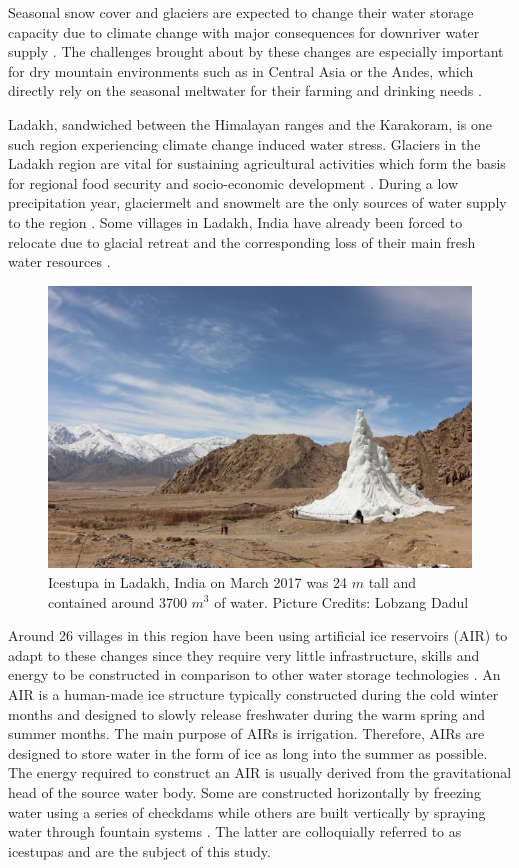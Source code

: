 \documentclass[utf8]{frontiersSCNS}
\begin{document}
Seasonal snow cover and glaciers are expected to change their water storage capacity due to climate
change with major consequences for downriver water supply \citep{Immerzeel_2020}. The challenges brought about
by these changes are especially important for dry mountain environments such as in Central Asia or the Andes,
which directly rely on the seasonal meltwater for their farming and drinking needs \citep{HoelzleBarandun_2019,
	Apel_2018, Buytaert_2017, Chen_2016, UNGERSHAYESTEH_2013}.

Ladakh, sandwiched between the Himalayan ranges and the Karakoram, is one such region experiencing climate
change induced water stress. Glaciers in the Ladakh region are vital for sustaining agricultural activities which
form the basis for regional food security and socio-economic development \citep{Labbal_2000, Schmidt_2012}.
During a low precipitation year, glaciermelt and snowmelt are the only sources of water supply to the region
\citep{Thayyen_2010}. Some villages in Ladakh, India have already been forced to relocate due to glacial retreat
and the corresponding loss of their main fresh water resources \citep{zanskar}.

\begin{figure}
	\begin{center}
		\includegraphics[width=10 cm]{Figures/Figure_1.jpg}
	\end{center}
	\caption{Icestupa in Ladakh, India on March 2017 was 24 $m$ tall and contained around 3700 $m^3$
		of water. Picture Credits: Lobzang Dadul}
	\label{fig:old_icestupa}
\end{figure}

Around 26 villages in this region \citep{isc} have been using artificial ice reservoirs (AIR) to adapt to these changes since
they require very little infrastructure, skills and energy to be constructed in comparison to other water
storage technologies \citep{IPCC_2019,10.1659/MRD-JOURNAL-D-18-00072.1}. An AIR is a human-made ice
structure typically constructed during the cold winter months and designed to slowly release freshwater during
the warm spring and summer months.  The main purpose of AIRs is irrigation. Therefore, AIRs are designed to
store water in the form of ice as long into the summer as possible. The energy required to construct an AIR is
usually derived from the gravitational head of the source water body. Some are constructed horizontally by
freezing water using a series of checkdams while others are built vertically by spraying water through fountain
systems \citep{Nusser_2018}. The latter are colloquially referred to as icestupas and are the subject of this
study.
\end{document}
